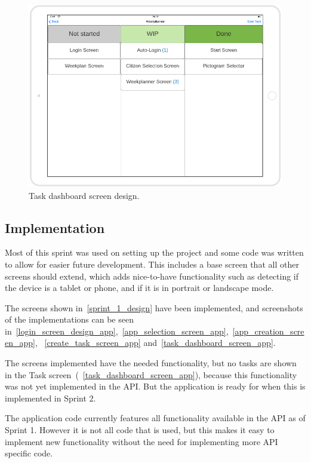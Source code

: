 \begin{figure}[H]
    \includegraphics[width=\textwidth]{Sprint_1/images/task_dashboard_screen.png}
    \caption{Task dashboard screen design.}
    \label{task_dashboard_screen}
\end{figure}

\subsection{Implementation}
Most of this sprint was used on setting up the project and some code was written to allow for easier future development.
This includes a base screen that all other screens should extend, which adds nice-to-have functionality such as detecting if the device is a tablet or phone, and if it is in portrait or landscape mode.

The screens shown in~\autoref{sprint_1_design} have been implemented, and screenshots of the implementations can be seen in~\autoref{login_screen_design_app},~\autoref{app_selection_screen_app},~\autoref{app_creation_screen_app}, ~\autoref{create_task_screen_app} and~\autoref{task_dashboard_screen_app}.

The screens implemented have the needed functionality, but no tasks are shown in the Task screen~(~\autoref{task_dashboard_screen_app}), because this functionality was not yet implemented in the API.
But the application is ready for when this is implemented in Sprint 2.

The application code currently features all functionality available in the API as of Sprint 1.
However it is not all code that is used, but this makes it easy to implement new functionality without the need for implementing more API specific code. 

